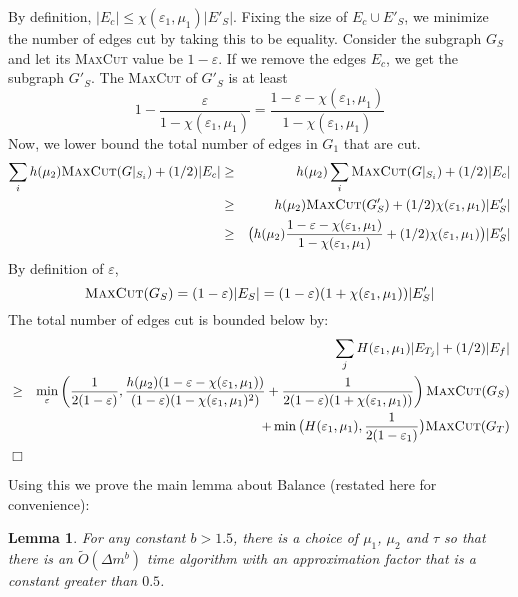 \documentclass[11pt]{article}
\newtheorem{Lem}[theorem]{Lemma}
\newenvironment{myproof}{\noindent {\sc Proof:}}{$\Box$}
\def\epsilon{\varepsilon}
\newcommand\Balance{{\sc Balance}\xspace}
\newcommand\otilde{\widetilde{O}}
\def\maxcut{\textsc{MaxCut}\xspace}
\begin{document}
\begin{myproof}
By definition, $|E_c| \leq \chi(\epsilon_1,\mu_1)|E'_S|$. Fixing the size
of $E_c \cup E'_S$, we minimize the number of edges cut by taking
this to be equality. Consider the subgraph $G_S$ and let its
\maxcut value be $1-\epsilon$. If we remove the edges $E_c$,
we get the subgraph $G'_S$. The \maxcut of $G'_S$ is at least
$$ 1 - \frac{\epsilon}{1-\chi(\epsilon_1,\mu_1)} = \frac{1 - \epsilon - \chi(\epsilon_1,\mu_1)}{1-\chi(\epsilon_1,\mu_1)}$$
Now, we lower bound the total number of edges in $G_1$ that are cut.
\begin{eqnarray*} \sum_i h(\mu_2)\maxcut(G|_{S_i}) + (1/2)|E_c| & \geq & h(\mu_2) \sum_i \maxcut(G|_{S_i}) + (1/2)|E_c|\\
& \geq & h(\mu_2) \maxcut(G'_S) + (1/2)\chi(\epsilon_1,\mu_1)|E'_S| \\
& \geq & \big(h(\mu_2) \frac{1-\epsilon-\chi(\epsilon_1,\mu_1)}{1-\chi(\epsilon_1,\mu_1)}
+ (1/2)\chi(\epsilon_1,\mu_1)\big)|E'_S|
\end{eqnarray*}
By definition of $\epsilon$,
$$ \maxcut(G_S) = (1-\epsilon) |E_S| = (1-\epsilon)(1+\chi(\epsilon_1,\mu_1)) |E'_S| $$
The total number of edges cut is bounded below by:
\begin{eqnarray*}
& & \sum_j H(\epsilon_1,\mu_1)|E_{T_j}| + (1/2)|E_f| \\
& \geq & \min_{\epsilon} \left(\frac{1}{2(1-\epsilon)},
\frac{h(\mu_2) (1-\epsilon-\chi(\epsilon_1,\mu_1))}{(1-\epsilon)(1-\chi(\epsilon_1,\mu_1)^2)}
+ \frac{1}{2(1-\epsilon)(1+\chi(\epsilon_1,\mu_1))}\right)\maxcut(G_S) \\
& & + \min\big(H(\epsilon_1,\mu_1), \frac{1}{2(1-\epsilon_1)}\big) \maxcut(G_T)
\end{eqnarray*}
\end{myproof}

Using this we prove the main lemma about {\Balance} (restated here
for convenience):

\begin{Lem}
For any constant $b > 1.5$, there is a choice of $\mu_1$, $\mu_2$ and
$\tau$ so that there is an $\otilde(\Delta m^b)$ time algorithm with an
approximation factor that is a constant greater than $0.5$.
\end{Lem}
\end{document}
